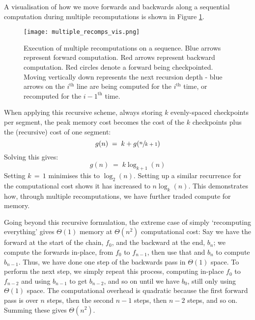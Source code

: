 A visualisation of how we move forwards and backwards along a sequential computation during multiple recomputations is shown in Figure \ref{fig:2-multiple-recomps-vis}.

\begin{figure}[h]
    \centering
    \texttt{[image: multiple\_recomps\_vis.png]}
    \caption{Execution of multiple recomputations on a sequence. Blue arrows represent forward computation. Red arrows represent backward computation. Red circles denote a forward being checkpointed. Moving vertically down represents the next recursion depth - blue arrows on the \(i^{\mathrm{th}}\) line are being computed for the \(i^{\mathrm{th}}\) time, or recomputed for the \({i-1}^{\mathrm{th}}\) time.}
    \label{fig:2-multiple-recomps-vis}
\end{figure}

When applying this recursive scheme, always storing \(k\) evenly-spaced checkpoints per segment, the peak memory cost becomes the cost of the \(k\) checkpoints plus the (recursive) cost of one segment:
\begin{equation*}
    g(n) \;=\; k + g(\sfrac{n}{k+1})
\end{equation*}
Solving this gives:
\begin{equation*}
    g(n) \;=\; k\log_{k+1}(n)
\end{equation*}
Setting \(k\,=\,1\) minimises this to \(\log_2(n)\).
Setting up a similar recurrence for the computational cost shows it has increased to \(n\log_k(n)\).
This demonstrates how, through multiple recomputations, we have further traded compute for memory.

Going beyond this recursive formulation, the extreme case of simply `recomputing everything' gives \(\Theta(\mathrm{1})\) memory at \(\Theta(n^2)\) computational cost:
Say we have the forward at the start of the chain, \(f_0\), and the backward at the end, \(b_n\);
we compute the forwards in-place, from \(f_0\) to \(f_{n-1}\), then use that and \(b_n\) to compute \(b_{n-1}\).
Thus, we have done one step of the backwards pass in \(\Theta(\mathrm{1})\) space.
To perform the next step, we simply repeat this process, computing in-place \(f_0\) to \(f_{n-2}\) and using \(b_{n-1}\) to get \(b_{n-2}\), and so on until we have \(b_0\), still only using \(\Theta(\mathrm{1})\) space. The computational overhead is quadratic because the first forward pass is over \(n\) steps, then the second \(n-1\) steps, then \(n-2\) steps, and so on. Summing these gives \(\Theta(n^2)\).


